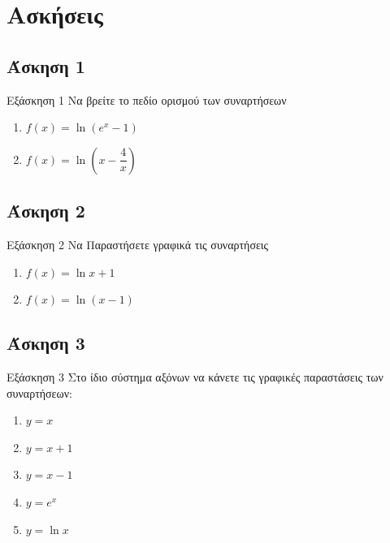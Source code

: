 \documentclass[greek]{beamer}
\begin{document}
\section{Ασκήσεις}
\subsection{Άσκηση 1}
\begin{frame}[label=Άσκηση1,t]{Εξάσκηση 1}
  Να βρείτε το πεδίο ορισμού των συναρτήσεων
  \begin{enumerate}
    \item<1-> $f(x)=\ln (e^x-1)$
    \item<2-> $f(x)=\ln \left( x-\dfrac{4}{x} \right) $
  \end{enumerate}

\end{frame}

\subsection{Άσκηση 2}
\begin{frame}[label=Άσκηση2,t]{Εξάσκηση 2}
  Να Παραστήσετε γραφικά τις συναρτήσεις
  \begin{enumerate}
    \item<1-> $f(x)=\ln x+1$
    \item<2-> $f(x)=\ln (x-1)$
  \end{enumerate}

\end{frame}

\subsection{Άσκηση 3}
\begin{frame}[label=Άσκηση3,t]{Εξάσκηση 3}
  Στο ίδιο σύστημα αξόνων να κάνετε τις γραφικές παραστάσεις των συναρτήσεων:
  \begin{enumerate}
    \item $y=x$
    \item $y=x+1$
    \item $y=x-1$
    \item $y=e^x$
    \item $y=\ln x$
  \end{enumerate}

\end{frame}
\end{document}
